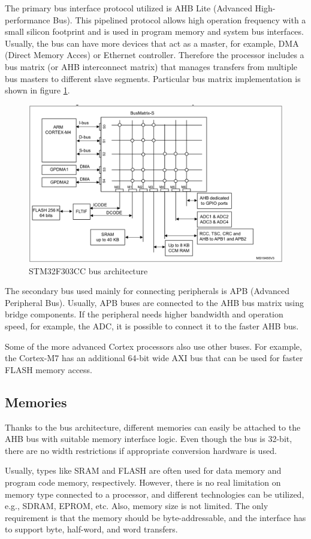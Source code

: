 The primary bus interface protocol utilized is AHB Lite (Advanced High-performance Bus). This pipelined protocol allows high operation frequency with a small silicon footprint and is used in program memory and system bus interfaces. Usually, the bus can have more devices that act as a master, for example, DMA (Direct Memory Acces) or Ethernet controller. Therefore the processor includes a bus matrix (or AHB interconnect matrix) that manages transfers from multiple bus masters to different slave segments. Particular bus matrix implementation is shown in figure \ref{fig:f303_busmatrix}.
\begin{figure}
\includegraphics[width=0.7\linewidth]{images/f303_bus_matrix}
\caption{STM32F303CC bus architecture \cite{f303_ref}} %
\label{fig:f303_busmatrix}
\end{figure}

The secondary bus used mainly for connecting peripherals is APB (Advanced Peripheral Bus). Usually, APB buses are connected to the AHB bus matrix using bridge components. If the peripheral needs higher bandwidth and operation speed, for example, the ADC, it is possible to connect it to the faster AHB bus.

Some of the more advanced Cortex processors also use other buses. For example, the Cortex-M7 has an additional 64-bit wide AXI bus that can be used for faster FLASH memory access. 

	\subsection{Memories}
	\label{sub:memories}
Thanks to the bus architecture, different memories can easily be attached to the AHB bus with suitable memory interface logic. Even though the bus is 32-bit, there are no width restrictions if appropriate conversion hardware is used.

Usually, types like SRAM and FLASH are often used for data memory and program code memory, respectively. However, there is no real limitation on memory type connected to a processor, and different technologies can be utilized, e.g., SDRAM, EPROM, etc. Also, memory size is not limited. The only requirement is that the memory should be byte-addressable, and the interface has to support byte, half-word, and word transfers.

